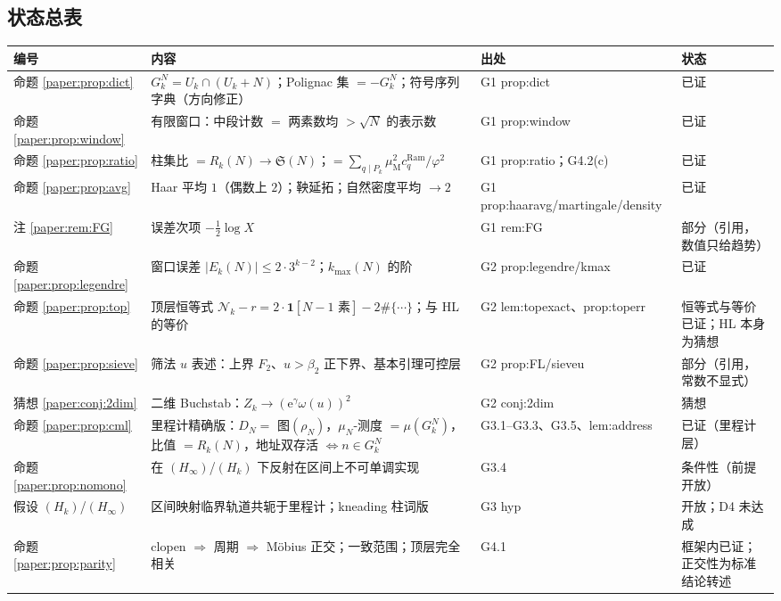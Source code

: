 \documentclass[11pt,a4paper]{article}
\newcommand{\Haar}{\mu}
\newcommand{\Sing}{\mathfrak S}
\newcommand{\Cnt}{\mathcal N}          %
\newcommand{\kmax}{k_{\max}}           %
\newcommand{\Mob}{\mu_{\mathrm{M}}}    %
\newcommand{\ee}{\mathrm e}
\newcommand{\Ram}{c^{\mathrm{Ram}}}    %
\theoremstyle{plain}
\theoremstyle{definition}
\begin{document}
\begin{CJK}{UTF8}{gbsn}
\section*{状态总表}
\begin{center}
\small
\begin{tabular}{p{1.5cm}p{6.6cm}p{2.3cm}p{4.0cm}}
\hline
编号 & 内容 & 出处 & 状态\\
\hline
命题 \ref{paper:prop:dict} & $G_k^N=U_k\cap(U_k+N)$；Polignac 集 $=-G_k^N$；符号序列字典（方向修正） & G1 prop:dict & 已证\\
命题 \ref{paper:prop:window} & 有限窗口：中段计数 $=$ 两素数均 $>\sqrt N$ 的表示数 & G1 prop:window & 已证\\
命题 \ref{paper:prop:ratio} & 柱集比 $=R_k(N)\to\Sing(N)$；$=\sum_{q\mid P_k}\Mob^2\Ram_q/\varphi^2$ & G1 prop:ratio；G4.2(c) & 已证\\
命题 \ref{paper:prop:avg} & Haar 平均 $1$（偶数上 $2$）；鞅延拓；自然密度平均 $\to2$ & G1 prop:haaravg/martingale/density & 已证\\
注 \ref{paper:rem:FG} & 误差次项 $-\frac12\log X$ & G1 rem:FG & 部分（引用，数值只给趋势）\\
命题 \ref{paper:prop:legendre} & 窗口误差 $|E_k(N)|\le2\cdot3^{k-2}$；$\kmax(N)$ 的阶 & G2 prop:legendre/kmax & 已证\\
命题 \ref{paper:prop:top} & 顶层恒等式 $\Cnt_k-r=2\cdot\mathbf 1[N-1\text{ 素}]-2\#\{\cdots\}$；与 HL 的等价 & G2 lem:topexact、prop:toperr & 恒等式与等价已证；HL 本身为猜想\\
命题 \ref{paper:prop:sieve} & 筛法 $u$ 表述：上界 $F_2$、$u>\beta_2$ 正下界、基本引理可控层 & G2 prop:FL/sieveu & 部分（引用，常数不显式）\\
猜想 \ref{paper:conj:2dim} & 二维 Buchstab：$Z_k\to(\ee^\gamma\omega(u))^2$ & G2 conj:2dim & 猜想\\
命题 \ref{paper:prop:cml} & 里程计精确版：$D_N=$ 图$(\rho_N)$，$\Haar_N$-测度 $=\Haar(G_k^N)$，比值 $=R_k(N)$，地址双存活 $\iff n\in G_k^N$ & G3.1--G3.3、G3.5、lem:address & 已证（里程计层）\\
命题 \ref{paper:prop:nomono} & 在 $(H_\infty)$/$(H_k)$ 下反射在区间上不可单调实现 & G3.4 & 条件性（前提开放）\\
假设 $(H_k)$/$(H_\infty)$ & 区间映射临界轨道共轭于里程计；kneading 柱词版 & G3 hyp & 开放；D4 未达成\\
命题 \ref{paper:prop:parity} & clopen $\Rightarrow$ 周期 $\Rightarrow$ M\"obius 正交；一致范围；顶层完全相关 & G4.1 & 框架内已证；正交性为标准结论转述\\

\end{tabular}
\end{center}
\end{CJK}
\end{document}
